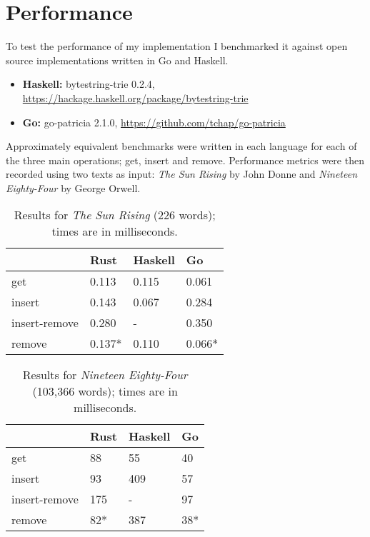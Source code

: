 \documentclass[a4paper,12pt]{article}
\begin{document}
\section{Performance}

To test the performance of my implementation I benchmarked it against open source implementations written in Go and Haskell.

\begin{itemize}
\item \textbf{Haskell:} bytestring-trie 0.2.4, \url{https://hackage.haskell.org/package/bytestring-trie}
\item \textbf{Go:} go-patricia 2.1.0, \url{https://github.com/tchap/go-patricia}
\end{itemize}

Approximately equivalent benchmarks were written in each language for each of the three main operations; get, insert and remove. Performance metrics were then recorded using two texts as input: \textit{The Sun Rising} by John Donne and \textit{Nineteen Eighty-Four} by George Orwell.\\

\begin{table}
\begin{center}
\begin{tabular}[h]{| l | l | l | l |}
\hline
                & \textbf{Rust} & \textbf{Haskell}  & \textbf{Go}   \\ \hline
get             & 0.113         & 0.115             & 0.061         \\ \hline
insert          & 0.143         & 0.067             & 0.284         \\ \hline
insert-remove   & 0.280         & -                 & 0.350         \\ \hline
remove          & 0.137*        & 0.110             & 0.066*        \\ \hline
\end{tabular}
\caption{Results for \textit{The Sun Rising} (226 words); times are in milliseconds.}
\end{center}
\end{table}

\begin{table}
\begin{center}
\begin{tabular}[h]{| l | l | l | l |}
\hline
                & \textbf{Rust} & \textbf{Haskell}  & \textbf{Go}   \\ \hline
get             & 88            &  55               & 40            \\ \hline
insert          & 93            &  409              & 57            \\ \hline
insert-remove   & 175           &  -                & 97            \\ \hline
remove          & 82*           &  387              & 38*           \\ \hline
\end{tabular}
\caption{Results for \textit{Nineteen Eighty-Four} (103,366 words); times are in milliseconds.}
\end{center}
\end{table}
\end{document}

